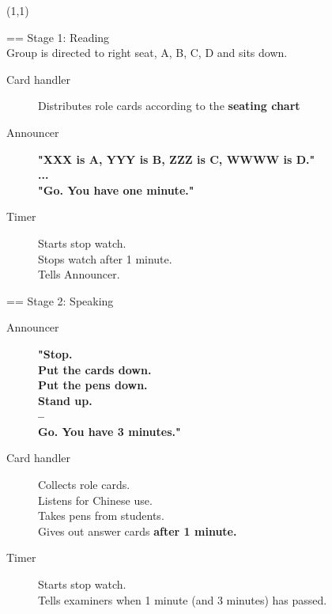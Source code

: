 \documentclass[a4paper]{article}
\begin{document}
\begin{textblock}{14}(1,1)

\Huge == Stage 1: Reading\\

\large \mdseries
Group is directed to right seat, A, B, C, D and sits down.\\

\begin{description}

\item [Card handler] Distributes role cards according to the \textbf{seating chart}\\
\item [Announcer]
\Large \bfseries
	"XXX is A, YYY is B, ZZZ is C, WWWW is D."\\
	...\\
	"Go. You have one minute."\\
\large \mdseries
\item [Timer]	Starts stop watch.\\
	Stops watch after 1 minute.\\
	Tells Announcer.\\

\end{description}

\Huge == Stage 2: Speaking\\

\large \mdseries

\begin{description}

\item [Announcer]
\Large \bfseries
	"Stop.\\
	Put the cards down.\\
	Put the pens down.\\
	Stand up.\\
	--\\
	Go. You have 3 minutes."\\

\large \mdseries
\item [Card handler]
	Collects role cards.\\
	Listens for Chinese use.\\
	Takes pens from students.\\
	Gives out answer cards \textbf{after 1 minute.}\\
\item [Timer]
	Starts stop watch.\\
	Tells examiners when 1 minute (and 3 minutes) has passed.\\


\end{description}
\end{textblock}
\end{document}

